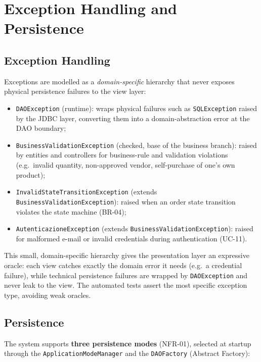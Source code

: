 \chapter{Exception Handling and Persistence}\label{ch:exceptions}

\section{Exception Handling}

Exceptions are modelled as a \emph{domain-specific} hierarchy that never
exposes physical persistence failures to the view layer:

\begin{itemize}
    \item \texttt{DAOException} (runtime): wraps physical failures such as
    \texttt{SQLException} raised by the JDBC layer, converting them into a
    domain-abstraction error at the DAO boundary;
    \item \texttt{BusinessValidationException} (checked, base of the business
    branch): raised by entities and controllers for business-rule and
    validation violations (e.g.\ invalid quantity, non-approved vendor,
    self-purchase of one's own product);
    \item \texttt{InvalidStateTransitionException} (extends
    \texttt{BusinessValidationException}): raised when an order state
    transition violates the state machine (BR-04);
    \item \texttt{AutenticazioneException} (extends
    \texttt{BusinessValidationException}): raised for malformed e-mail or
    invalid credentials during authentication (UC-11).
\end{itemize}

This small, domain-specific hierarchy gives the presentation layer an
expressive oracle: each view catches exactly the domain error it needs
(e.g.\ a credential failure), while technical persistence failures are
wrapped by \texttt{DAOException} and never leak to the view. The automated
tests assert the most specific exception type, avoiding weak oracles.

\section{Persistence}

The system supports \textbf{three persistence modes} (NFR-01), selected at
startup through the \texttt{ApplicationModeManager} and the
\texttt{DAOFactory} (Abstract Factory):

